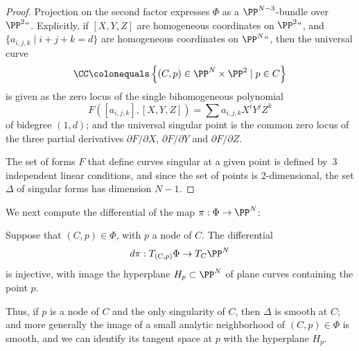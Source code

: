 \begin{proof}
Projection on the second factor expresses $\Phi$ as a $\PP^{N-3}$-bundle over $\PP^2` `$. Explicitly, if $[X,Y,Z]$ are homogeneous coordinates on $\PP^2` `$, and $\{a_{i,j,k} \mid i+j+k = d \}$ are homogeneous coordinates on $\PP^N` `$, then the universal curve
$$
\CC \colonequals  \left\{ (C, p) \in \PP^N \times \PP^2 \mid p \in C \right\}
$$
is given as the zero locus of the single bihomogeneous polynomial
$$
F([a_{i,j,k}], [X,Y,Z] ) = \sum a_{i,j,k} X^iY^jZ^k
$$
of bidegree $(1, d)$;
and the universal singular point is the common zero locus of the three partial derivatives $\partial F/\partial X$, $\partial F/\partial Y$ and  $\partial F/\partial Z$.

The set of forms $F$ that define curves singular at a given point is
defined by~3 independent linear conditions, and since the set of
points is 2-dimensional,
the set $\Delta$ of singular forms has dimension $N-1$.
\end{proof}

We next compute the differential of the map $\pi : \Phi \to \PP^N$:

\begin{lemma}\label{tangent space to discriminant}
Suppose that $(C,p)\in \Phi$, with $p$ a node of $C$.  The differential
$$
d\pi : T_{(C,p)}\Phi \to T_C \PP^N
$$
is injective, with image the hyperplane $H_p \subset \PP^N$ of plane curves containing the point $p$.
\end{lemma}

Thus, if $p$ is a node of $C$ and the only singularity of $C$, then $\Delta$ is smooth at $C$; and more generally the image of a small analytic neighborhood of $(C,p) \in \Phi$ is smooth, and we can identify its tangent space at $p$ with the hyperplane $H_p$.

